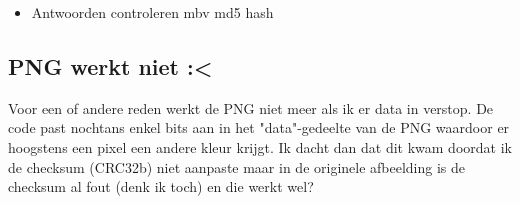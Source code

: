 \begin{itemize}
\item Antwoorden controleren mbv md5 hash 
\end{itemize}

\subsection{PNG werkt niet :\textless}
Voor een of andere reden werkt de PNG niet meer als ik er data in verstop. De code past nochtans enkel bits aan in het "data"-gedeelte van de PNG waardoor er hoogstens een pixel een andere kleur krijgt. Ik dacht dan dat dit kwam doordat ik de checksum (CRC32b) niet aanpaste maar in de originele afbeelding is de checksum al fout (denk ik toch) en die werkt wel? 